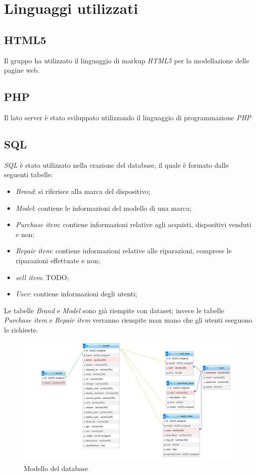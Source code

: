 \section{Linguaggi utilizzati}

\subsection{HTML5}
Il gruppo ha utilizzato il linguaggio di markup \textit{HTML5} per la
modellazione delle pagine web.

\subsection{PHP}
Il lato server è stato sviluppato utilizzando il linguaggio di programmazione \textit{PHP}

\subsection{SQL}
\textit{SQL} è stato utilizzato nella crazione del database, il quale è formato dalle seguenti tabelle:

\begin{itemize}
	\item \textit{Brand}: si riferisce alla marca del dispositivo;
	\item \textit{Model}: contiene le informazioni del modello di una marca;
	\item \textit{Purchase item}: contiene informazioni relative agli acquisti, dispositivi venduti e non;
	\item \textit{Repair item}: contiene informazioni relative alle riparazioni, comprese le riparazioni effettuate e non;
	\item \textit{sell item}: TODO;
	\item \textit{User}: contiene informazioni degli utenti;
\end{itemize}

Le tabelle \textit{Brand} e \textit{Model} sono già riempite con dataset; invece le tabelle \textit{Purchase item} e \textit{Repair item}
verranno riempite man mano che gli utenti eseguono le richieste.

\begin{figure}[H]
	\centering
	\includegraphics[scale=0.4]{res/database.png}
	\caption{Modello del database}
\end{figure}

